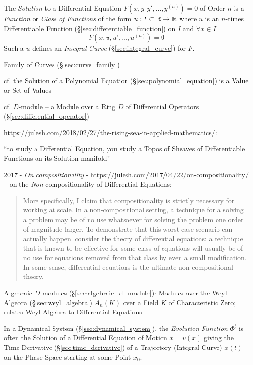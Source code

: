 The \emph{Solution} to a Differential Equation $F(x,y,y',\ldots,y^{(n)}) = 0$
of Order $n$ is a \emph{Function} or \emph{Class of Functions} of the form $u :
I \subset \mathbb{R} \rightarrow \mathbb{R}$ where $u$ is an $n$-times Differentiable
Function (\S\ref{sec:differentiable_function}) on $I$ and $\forall x \in I$:
\[
  F(x,u,u',\ldots,u^{(n)}) = 0
\]
Such a $u$ defines an \emph{Integral Curve} (\S\ref{sec:integral_curve}) for
$F$.

\fist Family of Curves (\S\ref{sec:curve_family})

\fist cf. the Solution of a Polynomial Equation
(\S\ref{sec:polynomial_equation}) is a Value or Set of Values

\fist cf. $D$-module -- a Module over a Ring $D$ of Differential Operators
(\S\ref{sec:differential_operator})

\url{https://julesh.com/2018/02/27/the-rising-sea-in-applied-mathematics/}:

``to study a Differential Equation, you study a Topos of Sheaves of
Differentiable Functions on its Solution manifold''

2017 - \emph{On compositionality} -
\url{https://julesh.com/2017/04/22/on-compositionality/} --
on the \emph{Non}-compositionality of Differential Equations:
\begin{quote}
  More specifically, I claim that compositionality is strictly necessary
  for working at scale. In a non-compositional setting, a technique for a
  solving a problem may be of no use whatsoever for solving the problem one
  order of magnitude larger. To demonstrate that this worst case scenario can
  actually happen, consider the theory of differential equations: a technique
  that is known to be effective for some class of equations will usually be of
  no use for equations removed from that class by even a small modification. In
  some sense, differential equations is the ultimate non-compositional theory.
\end{quote}

\fist Algebraic $D$-modules (\S\ref{sec:algebraic_d_module}): Modules over the
Weyl Algebra (\S\ref{sec:weyl_algebra}) $A_n(K)$ over a Field $K$ of
Characteristic Zero; relates Weyl Algebra to Differential Equations

In a Dynamical System (\S\ref{sec:dynamical_system}), the \emph{Evolution
  Function} $\Phi^t$ is often the Solution of a Differential Equation of Motion
$\dot{x} = v(x)$ giving the Time Derivative (\S\ref{sec:time_derivative}) of a
Trajectory (Integral Curve) $x(t)$ on the Phase Space starting at some Point
$x_0$.

